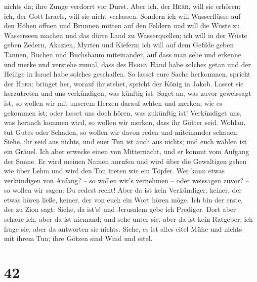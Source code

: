nichts da; ihre Zunge verdorrt vor Durst. Aber ich, der \textsc{Herr},
will sie erhören; ich, der Gott Israels, will sie nicht verlassen.
 Sondern ich will Wasserflüsse auf den Höhen öffnen und
Brunnen mitten auf den Feldern und will die Wüste zu Wasserseen machen
und das dürre Land zu Wasserquellen;  ich will in der
Wüste geben Zedern, Akazien, Myrten und Kiefern; ich will auf dem
Gefilde geben Tannen, Buchen und Buchsbaum miteinander, 
auf dass man sehe und erkenne und merke und verstehe zumal, dass des
\textsc{Herrn} Hand habe solches getan und der Heilige in Israel habe
solches geschaffen.  So lasset eure Sache herkommen,
spricht der \textsc{Herr}; bringet her, worauf ihr stehet, spricht der
König in Jakob.  Lasset sie herzutreten und uns
verkündigen, was künftig ist. Saget an, was zuvor geweissagt ist, so
wollen wir mit unserem Herzen darauf achten und merken, wie es gekommen
ist; oder lasset uns doch hören, was zukünftig ist! 
Verkündiget uns, was hernach kommen wird, so wollen wir merken, dass ihr
Götter seid. Wohlan, tut Gutes oder Schaden, so wollen wir davon reden
und miteinander schauen.  Siehe, ihr seid aus nichts, und
euer Tun ist auch aus nichts; und euch wählen ist ein Gräuel.
 Ich aber erwecke einen von Mitternacht, und er kommt vom
Aufgang der Sonne. Er wird meinen Namen anrufen und wird über die
Gewaltigen gehen wie über Lehm und wird den Ton treten wie ein Töpfer.
 Wer kann etwas verkündigen von Anfang? -- so wollen
wir's vernehmen -- oder weissagen zuvor? -- so wollen wir sagen: Du
redest recht! Aber da ist kein Verkündiger, keiner, der etwas hören
ließe, keiner, der von euch ein Wort hören möge.  Ich bin
der erste, der zu Zion sagt: Siehe, da ist's! und Jerusalem gebe ich
Prediger.  Dort aber schaue ich, aber da ist niemand; und
sehe unter sie, aber da ist kein Ratgeber; ich frage sie, aber da
antworten sie nichts.  Siehe, es ist alles eitel Mühe und
nichts mit ihrem Tun; ihre Götzen sind Wind und eitel.

\hypertarget{section-41}{%
\section{42}\label{section-41}}

